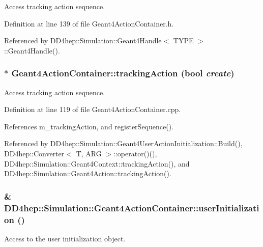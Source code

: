 Access tracking action sequence. 

Definition at line 139 of file Geant4ActionContainer.h.

Referenced by DD4hep::Simulation::Geant4Handle$<$ TYPE $>$::Geant4Handle().\hypertarget{class_d_d4hep_1_1_simulation_1_1_geant4_action_container_a4ff088a46753f37dadc07e22a0436382}{
\subsubsection[{trackingAction}]{ $\ast$ Geant4ActionContainer::trackingAction (bool {\em create})}}
\label{class_d_d4hep_1_1_simulation_1_1_geant4_action_container_a4ff088a46753f37dadc07e22a0436382}


Access tracking action sequence. 

Definition at line 119 of file Geant4ActionContainer.cpp.

References m\_\-trackingAction, and registerSequence().

Referenced by DD4hep::Simulation::Geant4UserActionInitialization::Build(), DD4hep::Converter$<$ T, ARG $>$::operator()(), DD4hep::Simulation::Geant4Context::trackingAction(), and DD4hep::Simulation::Geant4Action::trackingAction().\hypertarget{class_d_d4hep_1_1_simulation_1_1_geant4_action_container_a22b7e6487bab568fec3798fe1e1593f0}{
\subsubsection[{userInitialization}]{\& DD4hep::Simulation::Geant4ActionContainer::userInitialization ()}}
\label{class_d_d4hep_1_1_simulation_1_1_geant4_action_container_a22b7e6487bab568fec3798fe1e1593f0}


Access to the user initialization object. 

